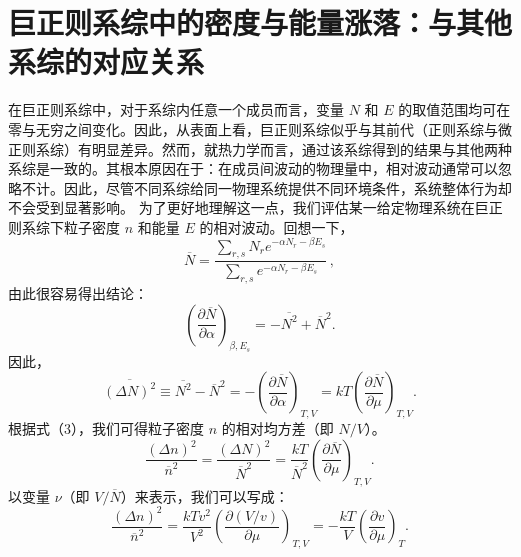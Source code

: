 \section{巨正则系综中的密度与能量涨落：与其他系综的对应关系}\label{ux5de8ux6b63ux5219ux7cfbux7efcux6da8ux843dux5bf9ux5e94}
在巨正则系综中，对于系综内任意一个成员而言，变量 \(N\) 和 \(E\) 的取值范围均可在零与无穷之间变化。因此，从表面上看，巨正则系综似乎与其前代（正则系综与微正则系综）有明显差异。然而，就热力学而言，通过该系综得到的结果与其他两种系综是一致的。其根本原因在于：在成员间波动的物理量中，相对波动通常可以忽略不计。因此，尽管不同系综给同一物理系统提供不同环境条件，系统整体行为却不会受到显著影响。
为了更好地理解这一点，我们评估某一给定物理系统在巨正则系综下粒子密度 \(n\) 和能量 \(E\) 的相对波动。回想一下，
\begin{equation}\tag{4.5.1}\label{eq:4.5.1}
\overline { { N } } = \frac { \sum _ { r , s } N _ { r } e ^{- \alpha N _ { r} - \beta E _ { s } } } { \sum _ { r , s } e ^{- \alpha N _ { r} - \beta E _ { s } } } \, ,
\end{equation}
由此很容易得出结论：
\begin{equation}\tag{4.5.2}\label{eq:4.5.2}
\left( \frac { \partial \overline { { N } } } { \partial \alpha } \right) _ { \beta , E _ { s } } = - \overline { { N ^{2} } } + \overline { { N } } ^{2} .
\end{equation}
因此，
\begin{equation}\tag{4.5.3}\label{eq:4.5.3}
\overline { { ( \Delta N ) ^{2} } } \equiv \overline { { N ^{2} } } - \overline { { N } } ^{2} = - \left( \frac { \partial \overline { { N } } } { \partial \alpha } \right) _ { T , V } = k T \left( \frac { \partial \overline { { N } } } { \partial \mu } \right) _ { T , V } .
\end{equation}
根据式（3），我们可得粒子密度 \(n\) 的相对均方差（即 \(N/V\)）。
\begin{equation}\tag{4.5.4}\label{eq:4.5.4}
\frac { ( \Delta n ) ^{2} } { \overline { { n } } ^{2} } = \frac { ( \Delta N ) ^{2} } { \overline { { N } } ^{2} } = \frac { k T } { \overline { { N } } ^{2} } \left( \frac { \partial \overline { { N } } } { \partial \mu } \right) _ { T , V } .
\end{equation}
以变量 \(\nu\)（即 \(V/\overline{N}\)）来表示，我们可以写成：
\begin{equation}\tag{4.5.5}\label{eq:4.5.5}
\frac { ( \Delta n ) ^{2} } { \overline { { n } } ^{2} } = \frac { k T v ^{2} } { V ^{2} } \left( \frac { \partial ( V / v ) } { \partial \mu } \right) _ { T , V } = - \frac { k T } { V } \left( \frac { \partial v } { \partial \mu } \right) _ { T } .
\end{equation}
